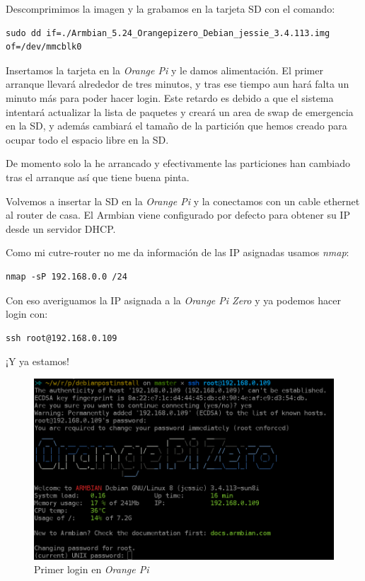 \documentclass[12pt,spanish,]{article}
\begin{document}
Descomprimimos la imagen y la grabamos en la tarjeta SD con el comando:

\begin{verbatim}
sudo dd if=./Armbian_5.24_Orangepizero_Debian_jessie_3.4.113.img of=/dev/mmcblk0
\end{verbatim}

Insertamos la tarjeta en la \emph{Orange Pi} y le damos alimentación. El
primer arranque llevará alrededor de tres minutos, y tras ese tiempo aun
hará falta un minuto más para poder hacer login. Este retardo es debido
a que el sistema intentará actualizar la lista de paquetes y creará un
area de swap de emergencia en la SD, y además cambiará el tamaño de la
partición que hemos creado para ocupar todo el espacio libre en la SD.

De momento solo la he arrancado y efectivamente las particiones han
cambiado tras el arranque así que tiene buena pinta.

Volvemos a insertar la SD en la \emph{Orange Pi} y la conectamos con un
cable ethernet al router de casa. El Armbian viene configurado por
defecto para obtener su IP desde un servidor DHCP.

Como mi cutre-router no me da información de las IP asignadas usamos
\emph{nmap}:

\begin{verbatim}
nmap -sP 192.168.0.0 /24
\end{verbatim}

Con eso averiguamos la IP asignada a la \emph{Orange Pi Zero} y ya
podemos hacer login con:

\begin{verbatim}
ssh root@192.168.0.109
\end{verbatim}

¡Y ya estamos!

\begin{figure}[htbp]
\centering
\includegraphics{src/img/OrangePiZero_FirstLogin.png}
\caption{Primer login en \emph{Orange Pi}}
\end{figure}
\end{document}
